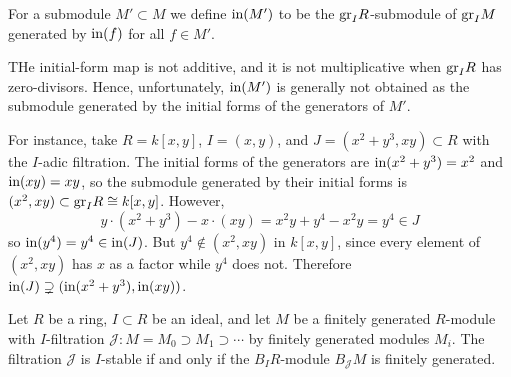 \documentclass[12pt]{amsproc}
\begin{document}
    \begin{definition}
        For a submodule $M' \subset M$ we define $\text{in}(M')$ to be the $\text{gr}_I R$-submodule of $\text{gr}_I M$ generated by $\text{in}(f)$ for all $f \in M'$. 
    \end{definition}

    \begin{remark}
        THe initial-form map is not additive, and it is not multiplicative when $\text{gr}_IR$ has zero-divisors. Hence, unfortunately, $\text{in}(M')$ is generally not obtained as the submodule generated by the initial forms of the generators of $M'$. 
        
        For instance, take $R = k[x,y]$, $I = (x,y)$, and $J = (x^2 + y^3, xy) \subset R$ with the $I$-adic filtration. The initial forms of the generators are $\text{in}(x^2 + y^3) = x^2$ and $\text{in}(xy) = xy$, so the submodule generated by their initial forms is $(x^2, xy) \subset \text{gr}_I R \cong k[x,y]$. 
        However,
        \[y \cdot (x^2 + y^3) - x \cdot (xy) = x^2y + y^4 - x^2y = y^4 \in J\]
        so $\text{in}(y^4) = y^4 \in \text{in}(J)$. But $y^4 \notin (x^2, xy)$ in $k[x,y]$, since every element of $(x^2, xy)$ has $x$ as a factor while $y^4$ does not. Therefore $\text{in}(J) \supsetneq (\text{in}(x^2 + y^3), \text{in}(xy))$.
    \end{remark}

    \begin{proposition}\label{stable}
        Let $R$ be a ring, $I \subset R$ be an ideal, and let $M$ be a finitely generated $R$-module with $I$-filtration $\mathcal{J} : M = 
        M_0 \supset M_1 \supset \cdots$ by finitely generated modules $M_i$. 
        The filtration $\mathcal{J}$ is $I$-stable if and only if the 
        $B_I R$-module $B_{\mathcal{J}}M$ is finitely generated.
    \end{proposition}
\end{document}
